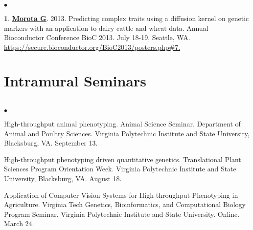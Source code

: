 \documentclass[margin,line,10pt]{res}
\newenvironment{list2}{
  \begin{list}{$\bullet$}{%
      \setlength{\itemsep}{0in}
      \setlength{\parsep}{0in} \setlength{\parskip}{0in}
      \setlength{\topsep}{0in} \setlength{\partopsep}{0in} 
      \setlength{\leftmargin}{0.2in}}}{\end{list}}
\begin{document}
\begin{resume}
\begin{list2}
\vspace{0.5cm}

\item  [{\bf 1}.] \textbf{\underline{Morota G}}. 2013. Predicting complex traits using a diffusion kernel on genetic markers with an application to dairy cattle and wheat data. Annual Bioconductor Conference BioC 2013. July 18-19, Seattle, WA. \textcolor{blue}{\href{https://secure.bioconductor.org/BioC2013/posters.php\#7}{https://secure.bioconductor.org/BioC2013/posters.php\#7. } }  
\end{list2}











\vspace{0.5cm}
\section{\sc Intramural Seminars}
\vspace{1cm}

\section{}
\begin{list2}

  \item  High-throughput animal phenotyping. Animal Science Seminar. Department of Animal and Poultry Sciences. Virginia Polytechnic Institute and State University, Blacksburg, VA. September 13.

    \vspace{0.5cm}


    \item High-throughput phenotyping driven quantitative genetics. Translational Plant Sciences Program Orientation Week. Virginia Polytechnic Institute and State University, Blacksburg, VA. August 18.

          \vspace{0.5cm}

\item Application of Computer Vision Systems for High-throughput Phenotyping in Agriculture. Virginia Tech Genetics, Bioinformatics, and Computational Biology Program Seminar. Virginia Polytechnic Institute and State University. Online. March 24. 


\end{list2}
\end{resume}
\end{document}
